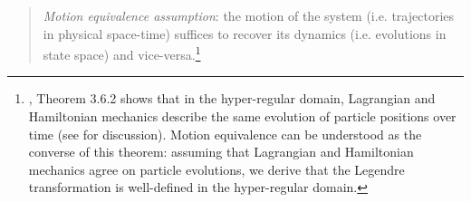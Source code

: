 \documentclass[letterpaper]{article}
\begin{document}
\begin{quotation}
\noindent
\textit{Motion equivalence assumption}: the motion of the system (i.e. trajectories in physical space-time) suffices to recover its dynamics (i.e. evolutions in state space) and vice-versa.\footnote{ \textcites[]{Abraham}, Theorem 3.6.2 shows that in the hyper-regular domain, Lagrangian and Hamiltonian mechanics describe the same evolution of particle positions over time (see \textcites[1180-1181]{Barrett2} for discussion). Motion equivalence can be understood as the converse of this theorem: assuming that Lagrangian and Hamiltonian mechanics agree on particle evolutions, we derive that the Legendre transformation is well-defined in the hyper-regular domain.}
\end{quotation}
\end{document}
